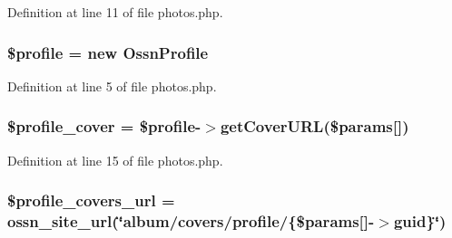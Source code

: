 Definition at line 11 of file photos.\+php.

\subsubsection[{\texorpdfstring{\$profile}{$profile}}]{\setlength{\rightskip}{0pt plus 5cm}\$profile = new {\bf Ossn\+Profile}}\hypertarget{photos_2pages_2photos_8php_aada8b96bccbcf78962195b117acdc07b}{}\label{photos_2pages_2photos_8php_aada8b96bccbcf78962195b117acdc07b}


Definition at line 5 of file photos.\+php.

\subsubsection[{\texorpdfstring{\$profile\+\_\+cover}{$profile_cover}}]{\setlength{\rightskip}{0pt plus 5cm}\$profile\+\_\+cover = \$profile-\/$>$get\+Cover\+U\+RL(\$params\mbox{[}\textquotesingle{}\mbox{]})}\hypertarget{photos_2pages_2photos_8php_ae6444f624d36ebfb80136c969122ece4}{}\label{photos_2pages_2photos_8php_ae6444f624d36ebfb80136c969122ece4}


Definition at line 15 of file photos.\+php.

\subsubsection[{\texorpdfstring{\$profile\+\_\+covers\+\_\+url}{$profile_covers_url}}]{\setlength{\rightskip}{0pt plus 5cm}\$profile\+\_\+covers\+\_\+url = {\bf ossn\+\_\+site\+\_\+url}(\char`\"{}album/covers/profile/\{\$params\mbox{[}\textquotesingle{}\mbox{]}-\/$>$guid\}\char`\"{})}\hypertarget{photos_2pages_2photos_8php_aab05889c3b1ad8df5f0a1929858d42aa}{}\label{photos_2pages_2photos_8php_aab05889c3b1ad8df5f0a1929858d42aa}


